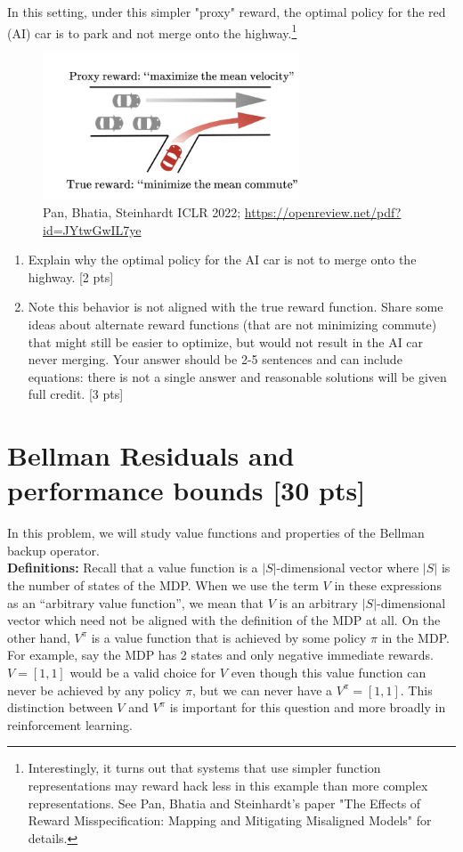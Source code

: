 \documentclass[11pt]{article}
\begin{document}
    In this setting, under this simpler "proxy" reward, the optimal policy for the red (AI) car is to park and not merge onto the highway.\footnote{Interestingly, it turns out that systems that use simpler function representations may reward hack less in this example than more complex representations. See Pan, Bhatia and Steinhardt's paper "The Effects of Reward Misspecification: Mapping and Mitigating Misaligned Models" for details.}
        \begin{figure}[h]
    \centering
    \includegraphics[width=3in]{commute_time.png}
    \caption{Pan, Bhatia, Steinhardt ICLR 2022; \url{https://openreview.net/pdf?id=JYtwGwIL7ye}}
    \label{fig:commute}
\end{figure}
\begin{enumerate}[label=(\alph*)]
    \item  Explain why the optimal policy for the AI car is not to merge onto the highway. [2 pts]\newpage
    \item Note this behavior is not aligned with the true reward function. Share some ideas about alternate reward functions (that are not minimizing commute) that might still be easier to optimize, but would not result in the AI car never merging. Your answer should be 2-5 sentences and can include equations: there is not a single answer and reasonable solutions will be given full credit. [3 pts]\newpage

\end{enumerate}

\newpage

\section{Bellman Residuals and performance bounds [30 pts]}

In this problem, we will study value functions and properties of the Bellman backup operator.
\\

\noindent \textbf{Definitions:} \noindent Recall that a value function is a $|S|$-dimensional vector where $|S|$ is the number of states of the MDP. When we use the term $V$ in these expressions as an ``arbitrary value function'', we mean that $V$ is an arbitrary $|S|$-dimensional vector which need not be aligned with the definition of the MDP at all. 
On the other hand, $V^\pi$ is a value function that is achieved by some policy $\pi$ in the MDP.
For example, say the MDP has 2 states and only negative immediate rewards. $V = [1,1]$ would be a valid choice for $V$ even though this value function can never be achieved by any policy $\pi$, but we can never have a $V^\pi = [1,1]$. This distinction between $V$ and $V^\pi$ is important for this question and more broadly in reinforcement learning.
\\
\end{document}

